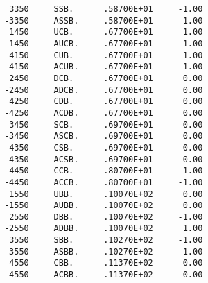 \begin{verbatim}
       3350     SSB.      .58700E+01     -1.00
      -3350     ASSB.     .58700E+01      1.00
       1450     UCB.      .67700E+01      1.00
      -1450     AUCB.     .67700E+01     -1.00
       4150     CUB.      .67700E+01      1.00
      -4150     ACUB.     .67700E+01     -1.00
       2450     DCB.      .67700E+01      0.00
      -2450     ADCB.     .67700E+01      0.00
       4250     CDB.      .67700E+01      0.00
      -4250     ACDB.     .67700E+01      0.00
       3450     SCB.      .69700E+01      0.00
      -3450     ASCB.     .69700E+01      0.00
       4350     CSB.      .69700E+01      0.00
      -4350     ACSB.     .69700E+01      0.00
       4450     CCB.      .80700E+01      1.00
      -4450     ACCB.     .80700E+01     -1.00
       1550     UBB.      .10070E+02      0.00
      -1550     AUBB.     .10070E+02      0.00
       2550     DBB.      .10070E+02     -1.00
      -2550     ADBB.     .10070E+02      1.00
       3550     SBB.      .10270E+02     -1.00
      -3550     ASBB.     .10270E+02      1.00
       4550     CBB.      .11370E+02      0.00
      -4550     ACBB.     .11370E+02      0.00


\end{verbatim}
